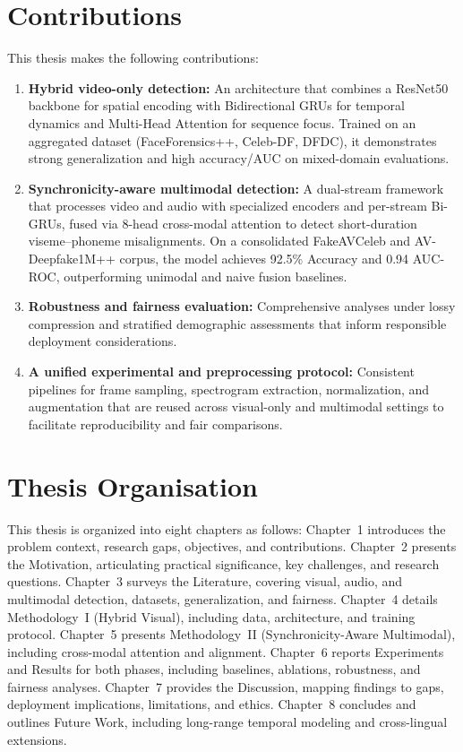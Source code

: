 \section{Contributions}
This thesis makes the following contributions:
\begin{enumerate}[leftmargin=*,label=\arabic*.]
    \item \textbf{Hybrid video-only detection:} An architecture that combines a ResNet50 backbone for spatial encoding with Bidirectional GRUs for temporal dynamics and Multi-Head Attention for sequence focus. Trained on an aggregated dataset (FaceForensics++, Celeb-DF, DFDC), it demonstrates strong generalization and high accuracy/AUC on mixed-domain evaluations.
    \item \textbf{Synchronicity-aware multimodal detection:} A dual-stream framework that processes video and audio with specialized encoders and per-stream Bi-GRUs, fused via 8-head cross-modal attention to detect short-duration viseme–phoneme misalignments. On a consolidated FakeAVCeleb and AV-Deepfake1M++ corpus, the model achieves 92.5\% Accuracy and 0.94 AUC-ROC, outperforming unimodal and naive fusion baselines.
    \item \textbf{Robustness and fairness evaluation:} Comprehensive analyses under lossy compression and stratified demographic assessments that inform responsible deployment considerations.
    \item \textbf{A unified experimental and preprocessing protocol:} Consistent pipelines for frame sampling, spectrogram extraction, normalization, and augmentation that are reused across visual-only and multimodal settings to facilitate reproducibility and fair comparisons.
\end{enumerate}

\section{Thesis Organisation}
This thesis is organized into eight chapters as follows: Chapter~1 introduces the problem context, research gaps, objectives, and contributions. Chapter~2 presents the Motivation, articulating practical significance, key challenges, and research questions. Chapter~3 surveys the Literature, covering visual, audio, and multimodal detection, datasets, generalization, and fairness. Chapter~4 details Methodology~I (Hybrid Visual), including data, architecture, and training protocol. Chapter~5 presents Methodology~II (Synchronicity-Aware Multimodal), including cross-modal attention and alignment. Chapter~6 reports Experiments and Results for both phases, including baselines, ablations, robustness, and fairness analyses. Chapter~7 provides the Discussion, mapping findings to gaps, deployment implications, limitations, and ethics. Chapter~8 concludes and outlines Future Work, including long-range temporal modeling and cross-lingual extensions.

